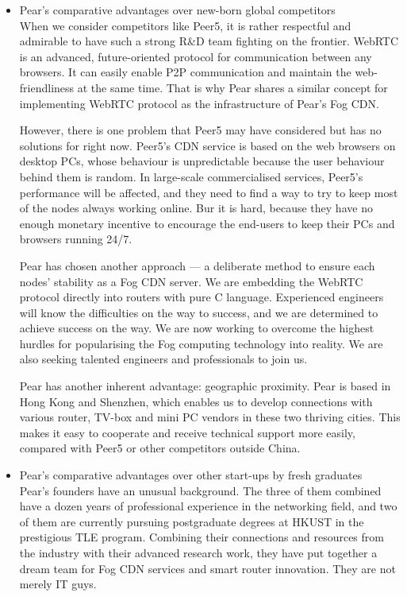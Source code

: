 \begin{itemize}
	\item Pear's comparative advantages over new-born global competitors\\
	When we consider competitors like Peer5, it is rather respectful and admirable to have such a strong R\&D team fighting on the frontier. WebRTC is an advanced, future-oriented protocol for communication between any browsers. It can easily enable P2P communication and maintain the web-friendliness at the same time. That is why Pear shares a similar concept for implementing WebRTC protocol as the infrastructure of Pear's Fog CDN. 
	
	However, there is one problem that Peer5 may have considered but has no solutions for right now. Peer5's CDN service is based on the web browsers on desktop PCs, whose behaviour is unpredictable because the user behaviour behind them is random. In large-scale commercialised services, Peer5's performance will be affected, and they need to find a way to try to keep most of the nodes always working online. Bur it is hard, because they have no enough monetary incentive to encourage the end-users to keep their PCs and browsers running 24/7.
	
	Pear has chosen another approach --- a deliberate method to ensure each nodes' stability as a Fog CDN server. We are embedding the WebRTC protocol directly into routers with pure C language.
	Experienced engineers will know the difficulties on the way to success, and we are determined to achieve success on the way. We are now working to overcome the highest hurdles for popularising the Fog computing technology into reality. We are also seeking talented engineers and professionals to join us. 
	
	Pear has another inherent advantage: geographic proximity. Pear is based in Hong Kong and Shenzhen, which enables us to develop connections with various router, TV-box and mini PC vendors in these two thriving cities. This makes it easy to cooperate and receive technical support more easily, compared with Peer5 or other competitors outside China.
	
	\item Pear's comparative advantages over other start-ups by fresh graduates\\
	Pear's founders have an unusual background. The three of them combined have a dozen years of professional experience in the networking field, and two of them are currently pursuing postgraduate degrees at HKUST in the prestigious TLE program. Combining their connections and resources from the industry with their advanced research work, they have put together a dream team for Fog CDN services and smart router innovation. They are not merely IT guys. 
	

\end{itemize}
